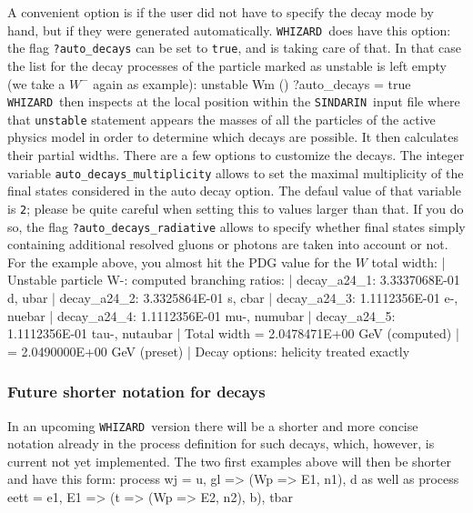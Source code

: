 \documentclass[12pt]{book}
\newenvironment{code}%
  {\begingroup\footnotesize
   \quote
   \Verbatim}%
  {\endVerbatim
   \endquote
   \endgroup\noindent}
\newcommand{\ttt}[1]{\texttt{#1}}
\newcommand{\whizard}{\ttt{WHIZARD}}
\newcommand{\sindarin}{\ttt{SINDARIN}}
\begin{document}
A convenient option is if the user did not have to specify the decay
mode by hand, but if they were generated automatically. \whizard\ does
have this option: the flag \ttt{?auto\_decays} can be set to
\ttt{true}, and is taking care of that. In that case the list for the
decay processes of the particle marked as unstable is left empty (we
take a $W^-$ again as example):
\begin{code}
unstable Wm () { ?auto_decays = true }
\end{code}
\whizard\ then inspects at the local position within the \sindarin\
input file where that \ttt{unstable} statement appears the masses of
all the particles of the active physics model in order to determine
which decays are possible. It then calculates their partial widths.
There are a few options to customize the decays. The integer variable
\ttt{auto\_decays\_multiplicity} allows to set the maximal
multiplicity of the final states considered in the auto decay
option. The defaul value of that variable is \ttt{2}; please be quite
careful when setting this to values larger than that. If you do so,
the flag \ttt{?auto\_decays\_radiative} allows to specify whether
final states simply containing additional resolved gluons or photons
are taken into account or not. For the example above, you almost hit
the PDG value for the $W$ total width:
\begin{code}
| Unstable particle W-: computed branching ratios:
|   decay_a24_1: 3.3337068E-01   d, ubar
|   decay_a24_2: 3.3325864E-01   s, cbar
|   decay_a24_3: 1.1112356E-01   e-, nuebar
|   decay_a24_4: 1.1112356E-01   mu-, numubar
|   decay_a24_5: 1.1112356E-01   tau-, nutaubar
|   Total width = 2.0478471E+00 GeV (computed)
|               = 2.0490000E+00 GeV (preset)
|   Decay options: helicity treated exactly
\end{code}

\subsubsection{Future shorter notation for decays}

{\color{red} In an upcoming \whizard\ version there will be a shorter and more
  concise notation already in the process definition for such decays,
  which, however, is current not yet implemented. The two first examples
  above will then be shorter and have this form:}
  \begin{code}
    process wj = u, gl => (Wp => E1, n1), d
  \end{code}
  {\color{red} as well as }
  \begin{code}
    process eett = e1, E1 => (t => (Wp => E2, n2), b), tbar
  \end{code}
\end{document}
